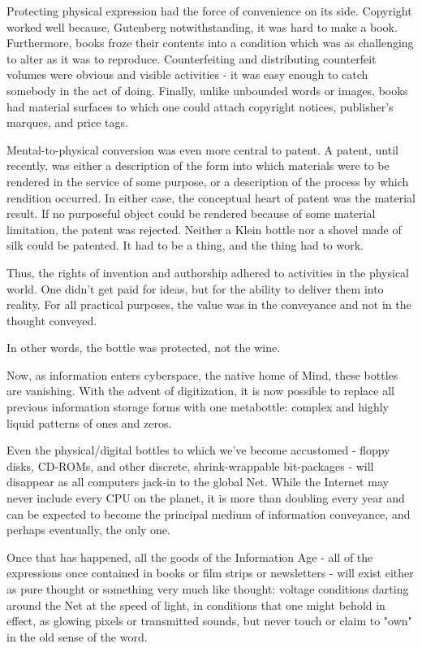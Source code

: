 \documentclass[
]{article}
\begin{document}
Protecting physical expression had the force of convenience on its side.
Copyright worked well because, Gutenberg notwithstanding, it was hard to
make a book. Furthermore, books froze their contents into a condition
which was as challenging to alter as it was to reproduce. Counterfeiting
and distributing counterfeit volumes were obvious and visible activities
- it was easy enough to catch somebody in the act of doing. Finally,
unlike unbounded words or images, books had material surfaces to which
one could attach copyright notices, publisher's marques, and price tags.

Mental-to-physical conversion was even more central to patent. A patent,
until recently, was either a description of the form into which
materials were to be rendered in the service of some purpose, or a
description of the process by which rendition occurred. In either case,
the conceptual heart of patent was the material result. If no purposeful
object could be rendered because of some material limitation, the patent
was rejected. Neither a Klein bottle nor a shovel made of silk could be
patented. It had to be a thing, and the thing had to work.

Thus, the rights of invention and authorship adhered to activities in
the physical world. One didn't get paid for ideas, but for the ability
to deliver them into reality. For all practical purposes, the value was
in the conveyance and not in the thought conveyed.

In other words, the bottle was protected, not the wine.

Now, as information enters cyberspace, the native home of Mind, these
bottles are vanishing. With the advent of digitization, it is now
possible to replace all previous information storage forms with one
metabottle: complex and highly liquid patterns of ones and zeros.

Even the physical/digital bottles to which we've become accustomed -
floppy disks, CD-ROMs, and other discrete, shrink-wrappable bit-packages
- will disappear as all computers jack-in to the global Net. While the
Internet may never include every CPU on the planet, it is more than
doubling every year and can be expected to become the principal medium
of information conveyance, and perhaps eventually, the only one.

Once that has happened, all the goods of the Information Age - all of
the expressions once contained in books or film strips or newsletters -
will exist either as pure thought or something very much like thought:
voltage conditions darting around the Net at the speed of light, in
conditions that one might behold in effect, as glowing pixels or
transmitted sounds, but never touch or claim to "own" in the old sense
of the word.
\end{document}
